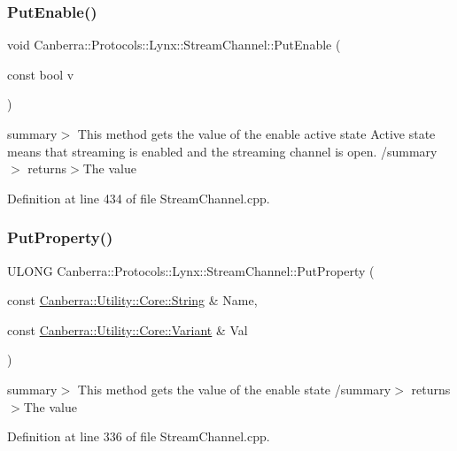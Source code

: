 \subsubsection{\texorpdfstring{Put\+Enable()}{PutEnable()}}
{\footnotesize\ttfamily void Canberra\+::\+Protocols\+::\+Lynx\+::\+Stream\+Channel\+::\+Put\+Enable (\begin{DoxyParamCaption}\item[{const bool}]{v }\end{DoxyParamCaption})}

summary$>$ This method gets the value of the enable active state Active state means that streaming is enabled and the streaming channel is open. /summary$>$ returns$>$The value

Definition at line 434 of file Stream\+Channel.\+cpp.

\mbox{\label{class_canberra_1_1_protocols_1_1_lynx_1_1_stream_channel_ad2c0bf4b51ed784406ee68895ad71320_ad2c0bf4b51ed784406ee68895ad71320}} 
\subsubsection{\texorpdfstring{Put\+Property()}{PutProperty()}}
{\footnotesize\ttfamily U\+L\+O\+NG Canberra\+::\+Protocols\+::\+Lynx\+::\+Stream\+Channel\+::\+Put\+Property (\begin{DoxyParamCaption}\item[{const \hyperlink{class_canberra_1_1_utility_1_1_core_1_1_string}{Canberra\+::\+Utility\+::\+Core\+::\+String} \&}]{Name,  }\item[{const \hyperlink{class_canberra_1_1_utility_1_1_core_1_1_variant}{Canberra\+::\+Utility\+::\+Core\+::\+Variant} \&}]{Val }\end{DoxyParamCaption})}

summary$>$ This method gets the value of the enable state /summary$>$ returns$>$The value

Definition at line 336 of file Stream\+Channel.\+cpp.

\mbox{\label{class_canberra_1_1_protocols_1_1_lynx_1_1_stream_channel_a8f92ad69f6d77233b6f0a0b1fdd8c3a0_a8f92ad69f6d77233b6f0a0b1fdd8c3a0}} 
